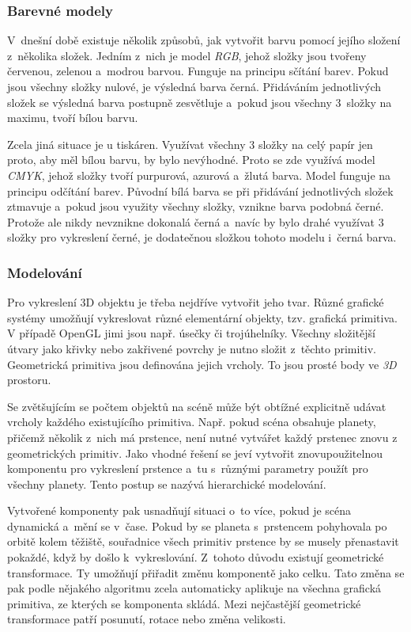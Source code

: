 \documentclass[a4paper,12pt]{article}
\begin{document}
\subsubsection{Barevné modely}

V~dnešní době existuje několik způsobů, jak vytvořit barvu pomocí jejího složení z~několika složek. Jedním z~nich je model \textit{RGB}, jehož složky jsou tvořeny červenou, zelenou a~modrou barvou. Funguje na principu sčítání barev. Pokud jsou všechny složky nulové, je výsledná barva černá. Přidáváním jednotlivých složek se výsledná barva postupně zesvětluje a~pokud jsou všechny 3~složky na maximu, tvoří bílou barvu.~\cite{graphic}

Zcela jiná situace je u tiskáren. Využívat všechny 3 složky na celý papír jen proto, aby měl bílou barvu, by bylo nevýhodné. Proto se zde využívá model \textit{CMYK}, jehož složky tvoří purpurová, azurová a~žlutá barva. Model funguje na principu odčítání barev. Původní bílá barva se při přidávání jednotlivých složek ztmavuje a~pokud jsou využity všechny složky, vznikne barva podobná černé. Protože ale nikdy nevznikne dokonalá černá a~navíc by bylo drahé využívat 3 složky pro vykreslení černé, je dodatečnou složkou tohoto modelu i~černá barva.~\cite{graphic}

\subsubsection{Modelování}

Pro vykreslení 3D objektu je třeba nejdříve vytvořit jeho tvar. Různé grafické systémy umožňují vykreslovat různé elementární objekty, tzv. grafická primitiva. V případě OpenGL jimi jsou např. úsečky či trojúhelníky. Všechny složitější útvary jako křivky nebo zakřivené povrchy je nutno složit z~těchto primitiv. Geometrická primitiva jsou definována jejich vrcholy. To jsou prosté body ve \textit{3D} prostoru.~\cite{graphic}

Se zvětšujícím se počtem objektů na scéně může být obtížné explicitně udávat vrcholy každého existujícího primitiva. Např. pokud scéna obsahuje planety, přičemž několik z~nich má prstence, není nutné vytvářet každý prstenec znovu z geometrických primitiv. Jako vhodné řešení se jeví vytvořit znovupoužitelnou komponentu pro vykreslení prstence a~tu s~různými parametry použít pro všechny planety. Tento postup se nazývá hierarchické modelování.~\cite{graphic}

Vytvořené komponenty pak usnadňují situaci o~to více, pokud je scéna dynamická a~mění se v~čase. Pokud by se planeta s~prstencem pohyhovala po orbitě kolem těžiště, souřadnice všech primitiv prstence by se musely přenastavit pokaždé, když by došlo k~vykreslování. Z~tohoto důvodu existují geometrické transformace. Ty umožňují přiřadit změnu komponentě jako celku. Tato změna se pak podle nějakého algoritmu zcela automaticky aplikuje na všechna grafická primitiva, ze kterých se komponenta skládá. Mezi nejčastější geometrické transformace patří posunutí, rotace nebo změna velikosti.~\cite{graphic}
\end{document}

